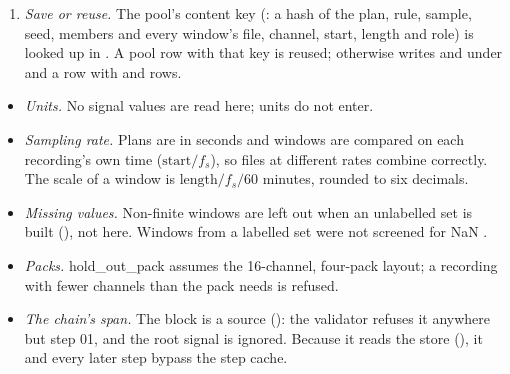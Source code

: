 \begin{enumerate}
\begin{enumerate}
    human marked \texttt{artifact} (annotations not soft-deleted, and window verdicts) or a
    span Settings excludes is dropped as ;
  \item exact duplicates (same recording row, start, length) are dropped, the first set
    listed winning;
  \item within one scale on one recording identity and channel, overlapping windows are
    dropped, the first set listed winning ();
  \item if per\_scale $> 0$: a seeded uniform sample of per\_scale windows per scale
    (), the rest ;
  \item rule \texttt{no\_overlap} only: across scales, any window overlapping a kept window of a
    smaller scale is dropped (); under \texttt{within\_scale}
    overlap across scales is allowed, never across roles;
  \item {} recomputes every role from the plan and counts overlaps across
    roles on one recording's time (fs1 and fs2 together); any misplaced window or
    cross-role overlap raises .
  \end{enumerate}
\item \emph{Save or reuse.} The pool's content key (: a hash of the plan, rule,
  sample, seed, members and every window's file, channel, start, length and role) is looked
  up in . A pool row with that key is reused; otherwise
   writes  and  under
   and a  row with
   and  rows.
\end{enumerate}

\begin{itemize}
\item \emph{Units.} No signal values are read here; units do not enter.
\item \emph{Sampling rate.} Plans are in seconds and windows are compared on each recording's
  own time ($\text{start}/f_s$), so files at different rates combine correctly. The scale of
  a window is $\text{length}/f_s/60$ minutes, rounded to six decimals.
\item \emph{Missing values.} Non-finite windows are left out when an unlabelled set is built
  (), not here. Windows from a labelled set were not screened
  for NaN .
\item \emph{Packs.} hold\_out\_pack assumes the 16-channel, four-pack layout; a recording with
  fewer channels than the pack needs is refused.
\item \emph{The chain's span.} The block is a source (): the validator
  refuses it anywhere but step 01, and the root signal is ignored. Because it reads the store
  (), it and every later step bypass the step cache.
\end{itemize}


